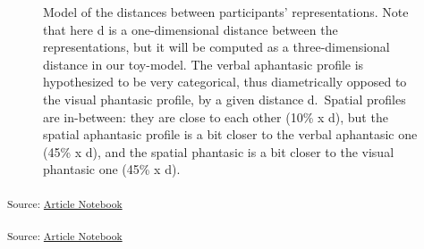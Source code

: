 \documentclass[
  authoryear]{elsarticle}
\begin{document}
\begin{figure}


\caption{\label{fig-distances-graph}Model of the distances between
participants' representations. Note that here d is a one-dimensional
distance between the representations, but it will be computed as a
three-dimensional distance in our toy-model. The verbal aphantasic
profile is hypothesized to be very categorical, thus diametrically
opposed to the visual phantasic profile, by a given distance d.~Spatial
profiles are in-between: they are close to each other (10\% x d), but
the spatial aphantasic profile is a bit closer to the verbal aphantasic
one (45\% x d), and the spatial phantasic is a bit closer to the visual
phantasic one (45\% x d).}

\end{figure}%

\textsubscript{Source:
\href{https://m-delem.github.io/2499-similarity-manuscript/index.qmd.html}{Article
Notebook}}

\textsubscript{Source:
\href{https://m-delem.github.io/2499-similarity-manuscript/index.qmd.html}{Article
Notebook}}
\end{document}
